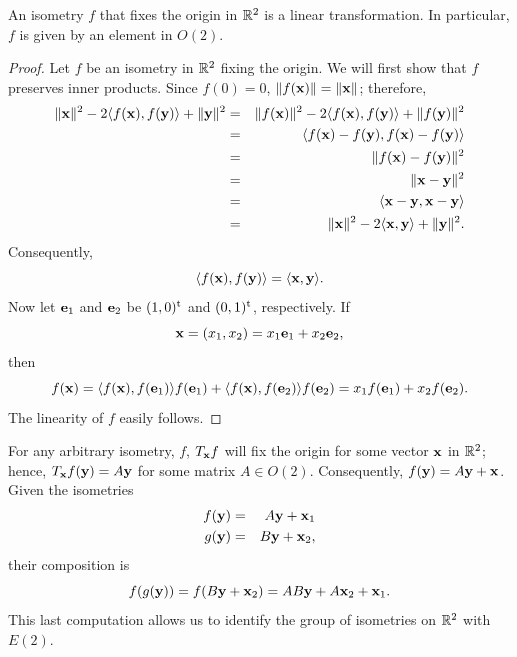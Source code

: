  
\begin{lemma}
An isometry $f$ that fixes the origin in ${\Bbb R}^2$ is a linear
transformation.  In particular, $f$ is given by an element in $O(2)$. 
\end{lemma}
 
 
\begin{proof}
Let $f$ be an isometry in ${\Bbb R}^2$ fixing the origin. We will
first show that $f$ preserves inner products. Since $f(0) = 0$, $\|
f({\bold x})\| = \| {\bold x} \|$; therefore,
\begin{eqnarray*}
\| {\bold x} \|^2 - 2 \langle f({\bold x}), f({\bold y}) \rangle + \|
{\bold y} \|^2 
& = &
\| f({\bold x}) \|^2 - 2 \langle f({\bold x}), f({\bold y}) \rangle +
\| f({\bold y}) \|^2 \\ 
& = &
\langle
f({\bold x}) -  f({\bold y}), f({\bold x}) -  f({\bold y})
\rangle \\
& = &
\| f({\bold x}) -  f({\bold y}) \|^2 \\
& = &
\| {\bold x} -  {\bold y} \|^2 \\
& = &
\langle
{\bold x} -  {\bold y}, {\bold x} -  {\bold y} \rangle \\
& = &
\| {\bold x} \|^2 - 2 \langle {\bold x}, {\bold y} \rangle + \| {\bold
y} \|^2. 
\end{eqnarray*}
Consequently,
\[
\langle f({\bold x}), f({\bold y}) \rangle
=
\langle {\bold x}, {\bold y} \rangle.
\]
Now let ${\bold e}_1$ and ${\bold e_2}$ be $(1, 0)^{\rm t}$ and $(0,
1)^{\rm t}$, respectively. If 
\[
{\bold x} = (x_1, x_2) = x_1 {\bold e}_1 + x_2 {\bold e}_2,
\]
then
\[
f({\bold x})
=
\langle
f({\bold x}), f({\bold e}_1)
\rangle
f({\bold e}_1)
+\langle
f({\bold x}), f({\bold e}_2)
\rangle
f({\bold e}_2)
=
x_1 f({\bold e}_1)+x_2 f({\bold e}_2).
\]
The linearity of $f$ easily follows.
\end{proof}
 
 
\vspace{1.5ex}
 
 
For any arbitrary isometry, $f$,  $T_{\bold x} f$ will fix the origin
for some vector ${\bold x}$ in ${\Bbb R}^2$; hence, $T_{\bold x}
f({\bold y}) = A {\bold y}$ for some matrix $A \in O(2)$.
Consequently, $f({\bold y}) = A {\bold y} + {\bold x}$.  Given the
isometries 
\begin{eqnarray*}
f({\bold y}) & = & A {\bold y} + {\bold x}_1 \\
g({\bold y}) & = & B {\bold y} + {\bold x}_2,
\end{eqnarray*}
their composition is
\[
f(g({\bold y})) =
f(B {\bold y} + {\bold x}_2) =
AB {\bold y} + A{\bold x}_2 + {\bold x}_1.
\]
This last computation allows us to identify the group of isometries on
${\Bbb R}^2$ with~$E(2)$. 
 
